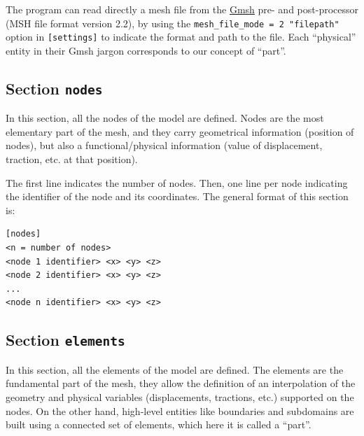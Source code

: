 \documentclass[a4paper,fleqn]{book}
\begin{document}
The program can read directly a mesh file from the \href{http://gmsh.info/}{Gmsh} pre- and post-processor (MSH file format version 2.2), by using the \texttt{mesh\_file\_mode = 2 "filepath"} option in \texttt{[settings]} to indicate the format and path to the file. Each ``physical'' entity in their Gmsh jargon corresponds to our concept of ``part''.

\subsection{Section \texttt{nodes}}
\label{sec:nodes}

In this section, all the nodes of the model are defined. Nodes are the most elementary part of the mesh, and they carry geometrical information (position of nodes), but also a functional/physical information (value of displacement, traction, etc. at that position). 

The first line indicates the number of nodes. Then, one line per node indicating the identifier of the node and its coordinates. The general format of this section is:
\begin{Verbatim}[frame=single, fontsize=\small, label={general format of section [nodes]}]
[nodes]
<n = number of nodes>
<node 1 identifier> <x> <y> <z>
<node 2 identifier> <x> <y> <z>
...
<node n identifier> <x> <y> <z>
\end{Verbatim} 

\subsection{Section \texttt{elements}}
\label{sec:elements}

In this section, all the elements of the model are defined. The elements are the fundamental part of the mesh, they allow the definition of an interpolation of the geometry and physical variables (displacements, tractions, etc.) supported on the nodes. On the other hand, high-level entities like boundaries and subdomains are built using a connected set of elements, which here it is called a ``part''. 
\end{document}

